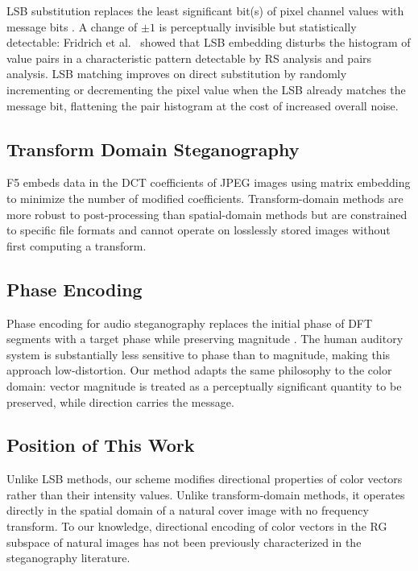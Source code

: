 \documentclass[12pt]{article}
\begin{document}
LSB substitution replaces the least significant bit(s) of pixel channel
values with message bits \cite{johnson2001steganography}. A change of
$\pm1$ is perceptually invisible but statistically detectable: Fridrich
et al.\ \cite{fridrich2001detecting} showed that LSB embedding disturbs
the histogram of value pairs in a characteristic pattern detectable by
RS analysis and pairs analysis. LSB matching improves on direct
substitution by randomly incrementing or decrementing the pixel value
when the LSB already matches the message bit, flattening the pair
histogram at the cost of increased overall noise.

\subsection{Transform Domain Steganography}

F5 \cite{westfeld2001f5} embeds data in the DCT coefficients of JPEG
images using matrix embedding to minimize the number of modified
coefficients. Transform-domain methods are more robust to post-processing
than spatial-domain methods but are constrained to specific file formats
and cannot operate on losslessly stored images without first computing a
transform.

\subsection{Phase Encoding}

Phase encoding for audio steganography replaces the initial phase of DFT
segments with a target phase while preserving magnitude
\cite{johnson2001steganography}. The human auditory system is substantially
less sensitive to phase than to magnitude, making this approach
low-distortion. Our method adapts the same philosophy to the color domain:
vector magnitude is treated as a perceptually significant quantity to be
preserved, while direction carries the message.

\subsection{Position of This Work}

Unlike LSB methods, our scheme modifies directional properties of color
vectors rather than their intensity values. Unlike transform-domain methods,
it operates directly in the spatial domain of a natural cover image with no
frequency transform. To our knowledge, directional encoding of color vectors
in the RG subspace of natural images has not been previously characterized
in the steganography literature.
\end{document}

